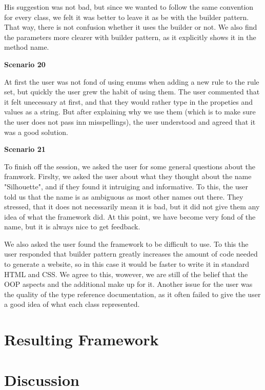 \documentclass[12pt]{article}
\begin{document}
        His suggestion was not bad, but since we wanted to follow the same convention for every class, we felt it was better to leave it as be with the builder pattern. That way, there is not confusion whether it uses the builder or not. We also find the parameters more clearer with builder pattern, as it explicitly shows it in the method name.

        \textbf{Scenario 20}
        
        At first the user was not fond of using enums when adding a new rule to the rule set, but quickly the user grew the habit of using them. The user commented that it felt unecessary at first, and that they would rather type in the propeties and values as a string. But after explaining why we use them (which is to make sure the user does not pass inn misspellings), the user understood and agreed that it was a good solution.

        \textbf{Scenario 21}

        
                

        To finish off the session, we asked the user for some general questions about the framwork. Firslty, we asked the user about what they thought about the name "Silhouette", and if they found it intruiging and informative. To this, the user told us that the name is as ambiguous as most other names out there. They stressed, that it does not necessarily mean it is bad, but it did not give them any idea of what the framework did. At this point, we have become very fond of the name, but it is always nice to get feedback.

        We also asked the user found the framework to be difficult to use. To this the user responded that builder pattern greatly increases the amount of code needed to generate a website, so in this case it would be faster to write it in standard HTML and CSS. We agree to this, wowever, we are still of the belief that the OOP aspects and the additional make up for it. Another issue for the user was the quality of the type reference documentation, as it often failed to give the user a good idea of what each class represented.

\section{Resulting Framework}

\section{Discussion}
\end{document}
